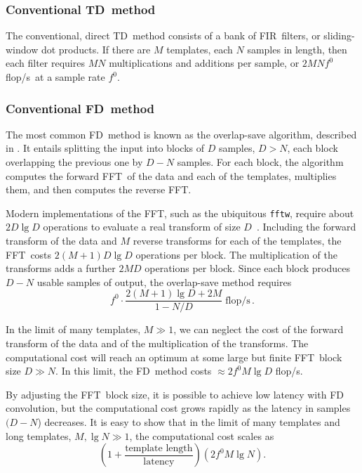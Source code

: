 \documentclass[preprint2]{aastex}
\newcommand{\tmpsamps}{\ensuremath{N}}
\newcommand{\numtmps}{\ensuremath{M}}
\newcommand{\fftblock}{\ensuremath{D}}
\newcommand{\fir}{FIR}%
\newcommand{\fft}{FFT}%
\newcommand{\flops}{flop/s}
\newcommand{\TD}{TD}%
\newcommand{\FD}{FD}%
\begin{document}
\subsubsection{Conventional \TD\ method}

The conventional, direct \TD\ method consists of a bank of \fir\ filters, or
sliding-window dot products.  If there are $\numtmps$ templates, each
$\tmpsamps$ samples in length, then each filter requires $M N$ multiplications
and additions per sample, or $2 \numtmps \tmpsamps f^0$ \flops\ at a sample rate
$f^0$.

\subsubsection{Conventional \FD\ method}

The most common \FD\ method is known as the overlap-save algorithm, described in
\citet{numerical-recipes-chapter-13}.  It entails splitting the input into blocks of $D$
samples, $D > \tmpsamps$, each block overlapping the previous one by $D - \tmpsamps$
samples.  For each block, the algorithm computes the forward \fft\ of the data and
each of the templates, multiplies them, and then computes the reverse \fft.

Modern implementations of the \fft, such as the ubiquitous \texttt{fftw}, require about
$2 \fftblock \lg \fftblock$ operations to evaluate a real transform of size
$\fftblock$~\citep{Johnson:2007p9654}.  Including the forward transform of the data and
$M$ reverse transforms for each of the templates, the \fft\ costs $2 (\numtmps + 1)
\fftblock \lg \fftblock$ operations per block.  The multiplication of the transforms adds
a further $2 \numtmps \fftblock$ operations per block.  Since each block produces
$\fftblock - \tmpsamps$ usable samples of output, the overlap-save method requires
$$
f^0 \cdot \frac{2 (\numtmps + 1) \lg \fftblock + 2 \numtmps}{1 - \tmpsamps/\fftblock} \; \mathrm{\flops} \,.
$$

In the limit of many templates, $M \gg 1$, we can neglect the cost of the forward
transform of the data and of the multiplication of the transforms.  The computational
cost will reach an optimum at some large but finite \fft\ block size
$\fftblock \gg \tmpsamps$.  In this limit, the \FD\ method costs
$\approx 2 f^0 \numtmps \lg \fftblock$ \flops.

By adjusting the \fft\ block size, it is possible to achieve low latency with FD
convolution, but the computational cost grows rapidly as the latency in samples
$(D-N$) decreases.  It is easy to show that in the limit of many templates and
long templates, $M, \lg N \gg 1$, the computational cost scales as
%
$$
\left(1 + \frac{\textrm{template length}}{\textrm{latency}}\right) \left( 2 f^0 M \lg N \right).
$$
\end{document}
